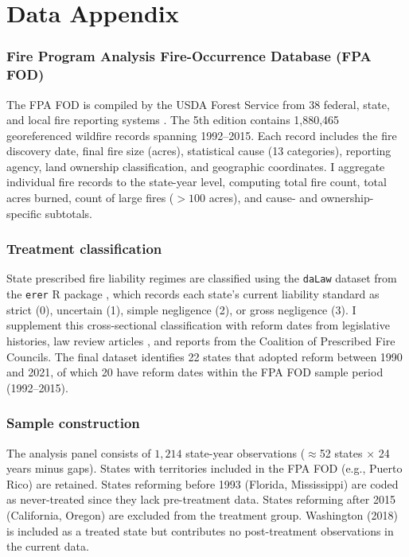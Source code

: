 \documentclass[12pt]{article}
\begin{document}
\label{apep_main_text_end}
\newpage


\newpage
\appendix

\section{Data Appendix}
\label{sec:data_appendix}

\subsubsection*{Fire Program Analysis Fire-Occurrence Database (FPA FOD)} The FPA FOD is compiled by the USDA Forest Service from 38 federal, state, and local fire reporting systems \citep{Short2017}. The 5th edition contains 1,880,465 georeferenced wildfire records spanning 1992--2015. Each record includes the fire discovery date, final fire size (acres), statistical cause (13 categories), reporting agency, land ownership classification, and geographic coordinates. I aggregate individual fire records to the state-year level, computing total fire count, total acres burned, count of large fires ($>100$ acres), and cause- and ownership-specific subtotals.

\subsubsection*{Treatment classification} State prescribed fire liability regimes are classified using the \texttt{daLaw} dataset from the \texttt{erer} R package \citep{Sun2006}, which records each state's current liability standard as strict (0), uncertain (1), simple negligence (2), or gross negligence (3). I supplement this cross-sectional classification with reform dates from legislative histories, law review articles \citep{Yoder2004, Yoder2008, Brenner2017}, and reports from the Coalition of Prescribed Fire Councils. The final dataset identifies 22 states that adopted reform between 1990 and 2021, of which 20 have reform dates within the FPA FOD sample period (1992--2015).

\subsubsection*{Sample construction} The analysis panel consists of $1{,}214$ state-year observations ($\approx$52 states $\times$ 24 years minus gaps). States with territories included in the FPA FOD (e.g., Puerto Rico) are retained. States reforming before 1993 (Florida, Mississippi) are coded as never-treated since they lack pre-treatment data. States reforming after 2015 (California, Oregon) are excluded from the treatment group. Washington (2018) is included as a treated state but contributes no post-treatment observations in the current data.
\end{document}
